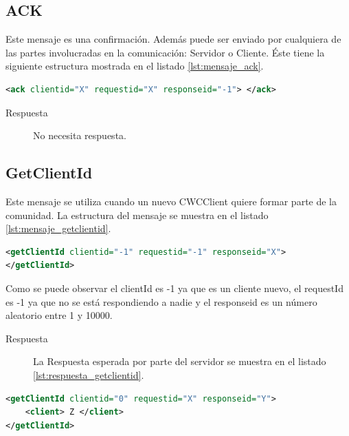 
\subsection{ACK}

Este mensaje es una confirmación. Además puede ser enviado por cualquiera de las partes involucradas en la comunicación: Servidor o Cliente. Éste tiene la siguiente estructura mostrada en el listado \ref{lst:mensaje_ack}.

\begin{lstlisting}[language=XML,caption={Mensaje ACK},label={lst:mensaje_ack}]
<ack clientid="X" requestid="X" responseid="-1"> </ack>
\end{lstlisting}

\begin{description}
\item[Respuesta] No necesita respuesta.
\end{description}


\subsection{GetClientId}

Este mensaje se utiliza cuando un nuevo CWCClient quiere formar parte de la comunidad. La estructura del mensaje se muestra en el listado \ref{lst:mensaje_getclientid}.

\begin{lstlisting}[language=XML,caption={Mensaje GetClientId},label={lst:mensaje_getclientid}]
<getClientId clientid="-1" requestid="-1" responseid="X"> 
</getClientId>
\end{lstlisting}


Como se puede observar el clientId es -1 ya que es un cliente nuevo, el requestId es -1 ya que no se está respondiendo a nadie y el responseid es un número aleatorio entre 1 y 10000. 

\begin{description}
\item[Respuesta] La Respuesta esperada por parte del servidor se muestra en el listado \ref{lst:respuesta_getclientid}.
\end{description}

 \begin{lstlisting}[language=XML,caption={Mensaje de Respuesta GetClientId},label={lst:respuesta_getclientid}]
<getClientId clientid="0" requestid="X" responseid="Y"> 
	<client> Z </client>
</getClientId>
\end{lstlisting}

